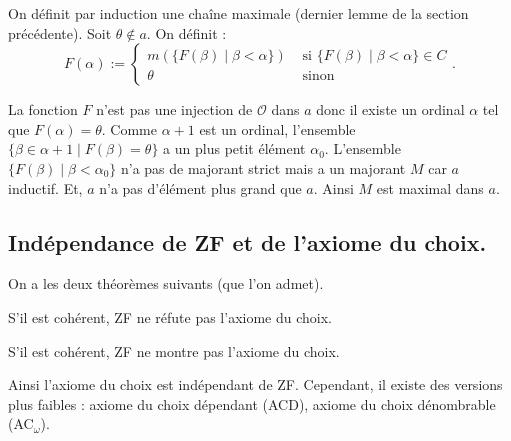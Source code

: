 \documentclass[./main]{subfiles}
\begin{document}
  On définit par induction une chaîne maximale (dernier lemme de la section précédente).
  Soit $\theta \not\in a$.
  On définit :
  \[
  F(\alpha) := \begin{cases}
    m(\{F(\beta)  \mid \beta < \alpha\} ) & \text{ si } \{F(\beta)  \mid \beta < \alpha\} \in C\\
    \theta & \text{ sinon}
  \end{cases}
  .\] 

  La fonction $F$ n'est pas une injection de $\mathcal{O}$ dans $a$ donc il existe un ordinal $\alpha$ tel que $F(\alpha) = \theta$.
  Comme $\alpha + 1$ est un ordinal, l'ensemble~$\{\beta \in \alpha + 1  \mid F(\beta) = \theta\}$ a un plus petit élément $\alpha_0$.
  L'ensemble $\{F(\beta)  \mid \beta < \alpha_0\}$ n'a pas de majorant strict mais a un majorant $M$ car $a$ inductif.
  Et, $a$ n'a pas d'élément plus grand que $a$.
  Ainsi $M$ est maximal dans $a$.

  \subsection{Indépendance de ZF et de l'axiome du choix.}

  On a les deux théorèmes suivants (que l'on admet).

  \begin{thm}[Gödel, 1938]
    S'il est cohérent, ZF ne réfute pas l'axiome du choix.
  \end{thm}

  \begin{thm}[Cohen, 1963]
    S'il est cohérent, ZF ne montre pas l'axiome du choix.
  \end{thm}

  Ainsi l'axiome du choix est indépendant de ZF.
  Cependant, il existe des versions plus faibles : axiome du choix dépendant (\textsf{ACD}), axiome du choix dénombrable (\textsf{AC}${}_\omega$).
\end{document}
